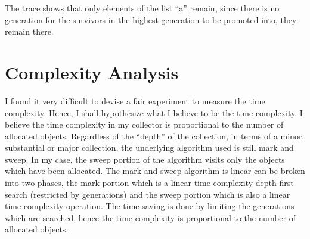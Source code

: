 \documentclass{article}
\begin{document}
The trace shows that only elements of the list ``a'' remain, since there is no generation for the survivors in the highest generation to be promoted into, they remain there. 

\section{Complexity Analysis}

I found it very difficult to devise a fair experiment to measure the time complexity. Hence, I shall hypothesize what I believe to be the time complexity. I believe the time complexity in my collector is proportional to the number of allocated objects. Regardless of the ``depth'' of the collection, in terms of a minor, substantial or major collection, the underlying algorithm used is still mark and sweep. In my case, the sweep portion of the algorithm visits only the objects which have been allocated. The mark and sweep algorithm is linear can be broken into two phases, the mark portion which is a linear time complexity depth-first search (restricted by generations) and the sweep portion which is also a linear time complexity operation. The time saving is done by limiting the generations which are searched, hence the time complexity is proportional to the number of allocated objects. 
\end{document}
